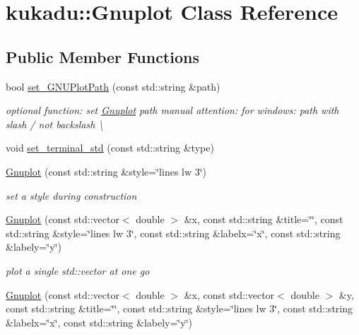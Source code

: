 \hypertarget{classkukadu_1_1Gnuplot}{}\section{kukadu\+:\+:Gnuplot Class Reference}
\label{classkukadu_1_1Gnuplot}
\subsection*{Public Member Functions}
\begin{DoxyCompactItemize}
\item 
bool \hyperlink{classkukadu_1_1Gnuplot_a04d7a36bbe70dcb878a1ae5d8299d012}{set\+\_\+\+G\+N\+U\+Plot\+Path} (const std\+::string \&path)
\begin{DoxyCompactList}\small\item\em optional function\+: set \hyperlink{classkukadu_1_1Gnuplot}{Gnuplot} path manual attention\+: for windows\+: path with slash \textquotesingle{}/\textquotesingle{} not backslash \textquotesingle{}\textbackslash{}\textquotesingle{} \end{DoxyCompactList}\item 
void \hyperlink{classkukadu_1_1Gnuplot_aecc02fa13c09680a010e50331d50804c}{set\+\_\+terminal\+\_\+std} (const std\+::string \&type)
\item 
\hyperlink{classkukadu_1_1Gnuplot_afb20839c235bdf281f61a7c8e1ea8de9}{Gnuplot} (const std\+::string \&style=\char`\"{}lines lw 3\char`\"{})\hypertarget{classkukadu_1_1Gnuplot_afb20839c235bdf281f61a7c8e1ea8de9}{}\label{classkukadu_1_1Gnuplot_afb20839c235bdf281f61a7c8e1ea8de9}

\begin{DoxyCompactList}\small\item\em set a style during construction \end{DoxyCompactList}\item 
\hyperlink{classkukadu_1_1Gnuplot_a116918cb455b18e367cfcd34dfe2ecab}{Gnuplot} (const std\+::vector$<$ double $>$ \&x, const std\+::string \&title=\char`\"{}\char`\"{}, const std\+::string \&style=\char`\"{}lines lw 3\char`\"{}, const std\+::string \&labelx=\char`\"{}x\char`\"{}, const std\+::string \&labely=\char`\"{}y\char`\"{})\hypertarget{classkukadu_1_1Gnuplot_a116918cb455b18e367cfcd34dfe2ecab}{}\label{classkukadu_1_1Gnuplot_a116918cb455b18e367cfcd34dfe2ecab}

\begin{DoxyCompactList}\small\item\em plot a single std\+::vector at one go \end{DoxyCompactList}\item 
\hyperlink{classkukadu_1_1Gnuplot_a78963c977dfcc32904344da61d35e57a}{Gnuplot} (const std\+::vector$<$ double $>$ \&x, const std\+::vector$<$ double $>$ \&y, const std\+::string \&title=\char`\"{}\char`\"{}, const std\+::string \&style=\char`\"{}lines lw 3\char`\"{}, const std\+::string \&labelx=\char`\"{}x\char`\"{}, const std\+::string \&labely=\char`\"{}y\char`\"{})\hypertarget{classkukadu_1_1Gnuplot_a78963c977dfcc32904344da61d35e57a}{}\label{classkukadu_1_1Gnuplot_a78963c977dfcc32904344da61d35e57a}


\end{DoxyCompactItemize}
